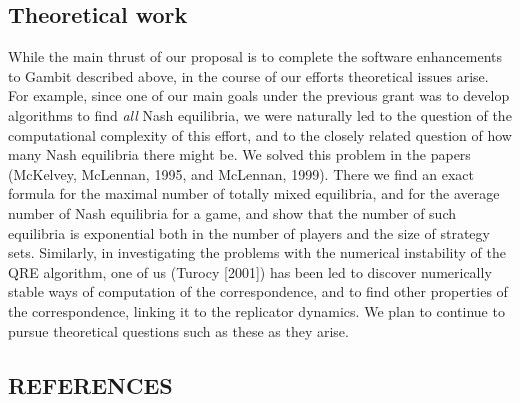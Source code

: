 \documentclass[12pt]{article}
\begin{document}
\subsection{Theoretical work}

While the main thrust of our proposal is to complete the software
enhancements to Gambit described above, in the course of our efforts
theoretical issues arise.  For example, since one of our main goals
under the previous grant was to develop algorithms to find {\it all}
Nash equilibria, we were naturally led to the question of the
computational complexity of this effort, and to the closely related
question of how many Nash equilibria there might be.  We solved this
problem in the papers (McKelvey, McLennan, 1995, and McLennan, 1999).
There we find an exact formula for the maximal number of totally mixed
equilibria, and for the average number of Nash equilibria for a game,
and show that the number of such equilibria is exponential both in the
number of players and the size of strategy sets.  Similarly, in
investigating the problems with the numerical instability of the QRE
algorithm, one of us (Turocy [2001]) has been led to discover numerically
stable ways of computation of the correspondence, and to find other
properties of the correspondence, linking it to the replicator
dynamics.  We plan to continue to pursue theoretical questions such
as these as they arise.

\newpage
\begin{center}
\section{\bf  REFERENCES }
\end{center}
\end{document}
